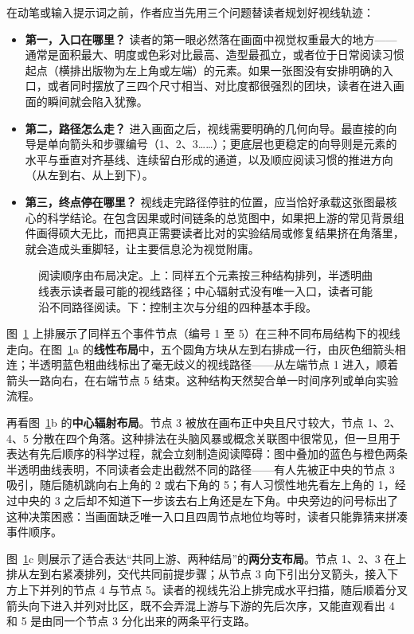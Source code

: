 在动笔或输入提示词之前，作者应当先用三个问题替读者规划好视线轨迹：

\begin{itemize}
\item \textbf{第一，入口在哪里？} 读者的第一眼必然落在画面中视觉权重最大的地方——通常是面积最大、明度或色彩对比最高、造型最孤立，或者位于日常阅读习惯起点（横排出版物为左上角或左端）的元素。如果一张图没有安排明确的入口，或者同时摆放了三四个尺寸相当、对比度都很强烈的团块，读者在进入画面的瞬间就会陷入犹豫。
\item \textbf{第二，路径怎么走？} 进入画面之后，视线需要明确的几何向导。最直接的向导是单向箭头和步骤编号（1、2、3……）；更底层也更稳定的向导则是元素的水平与垂直对齐基线、连续留白形成的通道，以及顺应阅读习惯的推进方向（从左到右、从上到下）。
\item \textbf{第三，终点停在哪里？} 视线走完路径停驻的位置，应当恰好承载这张图最核心的科学结论。在包含因果或时间链条的总览图中，如果把上游的常见背景组件画得硕大无比，而把真正需要读者比对的实验结局或修复结果挤在角落里，就会造成头重脚轻，让主要信息沦为视觉附庸。
\end{itemize}

\begin{figure}[htbp]\centering
\resizebox{\linewidth}{!}{}
\caption{阅读顺序由布局决定。上：同样五个元素按三种结构排列，半透明曲线表示读者最可能的视线路径；中心辐射式没有唯一入口，读者可能沿不同路径阅读。下：控制主次与分组的四种基本手段。}\label{fig:ch03-01}
\end{figure}

图~\ref{fig:ch03-01} 上排展示了同样五个事件节点（编号 1 至 5）在三种不同布局结构下的视线走向。在图~\ref{fig:ch03-01}a 的\textbf{线性布局}中，五个圆角方块从左到右排成一行，由灰色细箭头相连；半透明蓝色粗曲线标出了毫无歧义的视线路径——从左端节点 1 进入，顺着箭头一路向右，在右端节点 5 结束。这种结构天然契合单一时间序列或单向实验流程。

再看图~\ref{fig:ch03-01}b 的\textbf{中心辐射布局}。节点 3 被放在画布正中央且尺寸较大，节点 1、2、4、5 分散在四个角落。这种排法在头脑风暴或概念关联图中很常见，但一旦用于表达有先后顺序的科学过程，就会立刻制造阅读障碍：图中叠加的蓝色与橙色两条半透明曲线表明，不同读者会走出截然不同的路径——有人先被正中央的节点 3 吸引，随后随机跳向右上角的 2 或右下角的 5；有人习惯性地先看左上角的 1，经过中央的 3 之后却不知道下一步该去右上角还是左下角。中央旁边的问号标出了这种决策困惑：当画面缺乏唯一入口且四周节点地位均等时，读者只能靠猜来拼凑事件顺序。

图~\ref{fig:ch03-01}c 则展示了适合表达“共同上游、两种结局”的\textbf{两分支布局}。节点 1、2、3 在上排从左到右紧凑排列，交代共同前提步骤；从节点 3 向下引出分叉箭头，接入下方上下并列的节点 4 与节点 5。读者的视线先沿上排完成水平扫描，随后顺着分叉箭头向下进入并列对比区，既不会弄混上游与下游的先后次序，又能直观看出 4 和 5 是由同一个节点 3 分化出来的两条平行支路。

